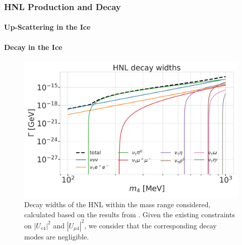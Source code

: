 \subsubsection{HNL Production and Decay} 


\paragraph{Up-Scattering in the Ice}


\paragraph{Decay in the Ice}


\begin{figure}
    \includegraphics{figures/hnl_simulation/decay_theory/hnl_decay_widths_up_to_1.0_GeV_log.png}
    \caption[HNL decay widths]{Decay widths of the HNL within the mass range considered, calculated based on the results from \cite{Coloma:2020lgy}. Given the existing constraints on $|U_{e4}|^{2}$ and $|U_{\mu4}|^{2}$, we consider that the corresponding decay modes are negligible.}
\end{figure}



